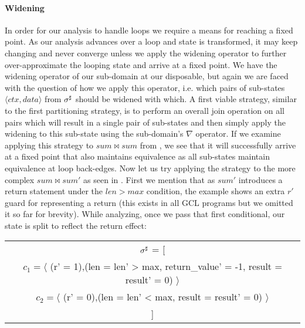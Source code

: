 

\paragraph{Widening}
In order for our analysis to handle loops we require a means for reaching a fixed point. As our analysis advances over a loop and state is transformed, it may keep changing and never converge unless we apply the widening operator to further over-approximate the looping state and arrive at a fixed point. We have the widening operator of our sub-domain at our disposable, but again we are faced with the question of how we apply this operator, i.e. which pairs of sub-states $\langle ctx , data \rangle$ from $\sigma^\sharp$ should be widened with which. A first viable strategy, similar to the first partitioning strategy, is to perform an overall join operation on all pairs which will result in a single pair of sub-states and then simply apply the widening to this sub-state using the sub-domain's $\nabla$ operator. If we examine applying this strategy to $sum \bowtie sum$ from , we see that it will successfully arrive at a fixed point that also maintains equivalence as all sub-states maintain equivalence at loop back-edges. Now let us try applying the strategy to the more complex $sum \bowtie sum'$ as seen in . First we mention that as $sum'$ introduces a return statement under the $len > max$ condition, the example shows an extra $r'$ guard for representing a return (this exists in all GCL programs but we omitted it so far for brevity). While analyzing, once we pass that first conditional, our state is split to reflect the return effect:
\\
\begin{tabular}{c}
$\sigma^\sharp$ = [
\\
$c_1 = \langle$ (r' = 1),(len = len' > max, return\_value' = -1, result = result' = 0) $\rangle$
\\
$c_2 = \langle$ (r' = 0),(len = len' < max, result = result' = 0) $\rangle$
\\
]
\end{tabular}
\\
